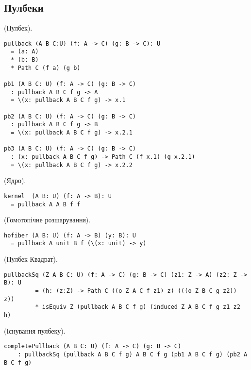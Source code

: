 \subsection{Пулбеки}

\begin{definition} (Пулбек).
\begin{lstlisting}
pullback (A B C:U) (f: A -> C) (g: B -> C): U
  = (a: A)
  * (b: B)
  * Path C (f a) (g b)

pb1 (A B C: U) (f: A -> C) (g: B -> C)
  : pullback A B C f g -> A
  = \(x: pullback A B C f g) -> x.1

pb2 (A B C: U) (f: A -> C) (g: B -> C)
  : pullback A B C f g -> B
  = \(x: pullback A B C f g) -> x.2.1

pb3 (A B C: U) (f: A -> C) (g: B -> C)
  : (x: pullback A B C f g) -> Path C (f x.1) (g x.2.1)
  = \(x: pullback A B C f g) -> x.2.2
\end{lstlisting}
\end{definition}

\begin{definition} (Ядро).
\begin{lstlisting}
kernel  (A B: U) (f: A -> B): U
  = pullback A A B f f
\end{lstlisting}
\end{definition}

\begin{definition} (Гомотопічне розшарування).
\begin{lstlisting}
hofiber (A B: U) (f: A -> B) (y: B): U
  = pullback A unit B f (\(x: unit) -> y)
\end{lstlisting}
\end{definition}

\begin{definition} (Пулбек Квадрат).
\begin{lstlisting}
pullbackSq (Z A B C: U) (f: A -> C) (g: B -> C) (z1: Z -> A) (z2: Z -> B): U
         = (h: (z:Z) -> Path C ((o Z A C f z1) z) (((o Z B C g z2)) z))
         * isEquiv Z (pullback A B C f g) (induced Z A B C f g z1 z2 h)
\end{lstlisting}
\end{definition}

\begin{theorem} (Існування пулбеку).
\begin{lstlisting}
completePullback (A B C: U) (f: A -> C) (g: B -> C)
    : pullbackSq (pullback A B C f g) A B C f g (pb1 A B C f g) (pb2 A B C f g)
\end{lstlisting}
\end{theorem}


